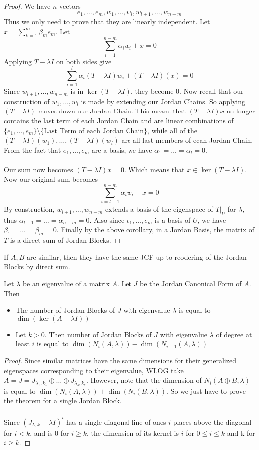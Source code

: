 \documentclass[a4paper]{article}
\begin{document}
\begin{thm}{}{}
\begin{proof}
We have $n$ vectors $$e_1,\dots,e_m,w_1,\dots,w_l,w_{l+1},\dots,w_{n-m}$$ Thus we only need to prove that they are linearly independent. Let $x=\sum_{k=1}^m\beta_me_m$. Let $$\sum_{i=1}^{n-m}\alpha_iw_i+x=0$$ Applying $T-\lambda I$ on both sides give $$\sum_{i=1}^{l}\alpha_i(T-\lambda I)w_i+(T-\lambda I)(x)=0$$ Since $w_{l+1},\dots,w_{n-m}$ is in $\ker(T-\lambda I)$, they become $0$. Now recall that our construction of $w_1,\dots,w_l$ is made by extending our Jordan Chains. So applying $(T-\lambda I)$ moves down our Jordan Chain. This means that $(T-\lambda I)x$ no longer contains the last term of each Jordan Chain and are linear combinations of $\{e_1,\dots,e_m\}\setminus\{\text{Last Term of each Jordan Chain}\}$, while all of the $(T-\lambda I)(w_1),\dots,(T-\lambda I)(w_l)$ are all last members of ecah Jordan Chain. From the fact that $e_1,\dots,e_m$ are a basis, we have $\alpha_1=\dots=\alpha_l=0$. \\~\\
Our sum now becomes $(T-\lambda I)x=0$. Which means that $x\in\ker(T-\lambda I)$. Now our original sum becomes $$\sum_{i=l+1}^{n-m}\alpha_iw_i+x=0$$ By construction, $w_{l+1},\dots,w_{n-m}$ extends a basis of the eigenspace of $T|_U$ for $\lambda$, thus $\alpha_{l+1}=\dots=\alpha_{n-m}=0$. Also since $e_1,\dots,e_m$ is a basis of $U$, we have $\beta_1=\dots=\beta_m=0$. 
Finally by the above corollary, in a Jordan Basis, the matrix of $T$ is a direct sum of Jordan Blocks. 
\end{proof}
\end{thm}


\begin{lmm}{}{} If $A,B$ are similar, then they have the same JCF up to reodering of the Jordan Blocks by direct sum. 
\end{lmm}

\begin{thm}{}{} Let $\lambda$ be an eigenvalue of a matrix $A$. Let $J$ be the Jordan Canonical Form of $A$. Then
\begin{itemize}
\item The number of Jordan Blocks of $J$ with eigenvalue $\lambda$ is equal to $\dim(\ker(A-\lambda I))$
\item Let $k>0$. Then number of Jordan Blocks of $J$ with eigenvalue $\lambda$ of degree at least $i$ is equal to $\dim(N_i(A,\lambda))-\dim(N_{i-1}(A,\lambda))$
\end{itemize}\tcbline\begin{proof} Since similar matrices have the same dimensions for their generalized eigenspaces corresponding to their eigenvalue, WLOG take $A=J=J_{\lambda_1,k_1}\oplus\dots\oplus J_{\lambda_s,k_s}$. However, note that the dimension of $N_i(A\oplus B,\lambda)$ is equal to $\dim(N_i(A,\lambda))+\dim(N_i(B,\lambda))$. So we just have to  prove the theorem for a single Jordan Block. \\~\\
Since $(J_{\lambda,k}-\lambda I)^i$ has a single diagonal line of ones $i$ places above the diagonal for $i<k$, and is $0$ for $i\geq k$, the dimension of its kernel is $i$ for $0\leq i\leq k$ and k for $i\geq k$. 
\end{proof}
\end{thm} 
\end{document}
